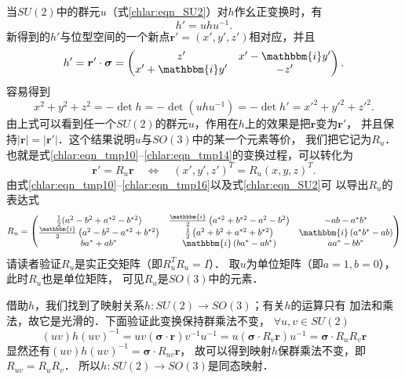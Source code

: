 当$SU(2)$中的群元$u$（式\eqref{chlar:eqn_SU2}）对$h$作幺正变换时，有
\begin{equation}\label{chlar:eqn_tmp10}
    h'= u h u^{-1} .
\end{equation}
新得到的$h'$与位型空间的一个新点$\boldsymbol{r}'=(x',y',z')$相对应，并且
\begin{equation}\label{chlar:eqn_tmp12}
    h'=\boldsymbol{r}'\cdot \boldsymbol{\sigma}
    =\begin{pmatrix}
        z' & x'- \mathbbm{i} y' \\ x'+ \mathbbm{i} y' & -z'
    \end{pmatrix} .
\end{equation}
容易得到
\begin{equation}\label{chlar:eqn_tmp14}
    x^2+y^2+z^2 = -\det h = -\det(u h u^{-1}) = -\det h' = x'^2+y'^2+z'^2 .
\end{equation}
由上式可以看到任一个$SU(2)$的群元$u$，作用在$h$上的效果是把$\boldsymbol{r}$变为$\boldsymbol{r}'$，
并且保持$|\boldsymbol{r}|=|\boldsymbol{r}'|$．这个结果说明$u$与$SO(3)$中的某一个元素等价，
我们把它记为$R_u$．也就是式\eqref{chlar:eqn_tmp10}--\eqref{chlar:eqn_tmp14}的变换过程，可以转化为
\begin{equation}\label{chlar:eqn_tmp16}
    \boldsymbol{r}'= R_u \boldsymbol{r} \quad \Leftrightarrow \quad
    (x', y', z')^T = R_u (x,y,z)^T .
\end{equation}
由式\eqref{chlar:eqn_tmp10}--\eqref{chlar:eqn_tmp16}以及式\eqref{chlar:eqn_SU2}可
以导出$R_u$的表达式
\begin{equation}\label{chlar:eqn_Ru}
    R_u=\begin{pmatrix}
    \frac{1}{2}(a^2-b^2+a^{*2}-b^{*2}) & 
    \frac{\mathbbm{i}}{2} \left(a^{*2}+b^{*2}-a^2-b^2\right) &     -a b-a^* b^* \\
    \frac{\mathbbm{i}}{2} \left(a^2-b^2-a^{*2}+b^{*2}\right) &
    \frac{1}{2} \left(a^2+b^2+a^{*2}+b^{*2}\right) & 
    \mathbbm{i} \left(a^* b^* -a b\right) \\
    b a^*+a b^* & \mathbbm{i} \left(b a^*-a b^*\right) &    a a^*-b b^* 
\end{pmatrix} 
\end{equation}  %
请读者验证$R_u$是实正交矩阵（即$R_u^T R_u=I$）．
取$u$为单位矩阵（即$a=1,b=0$），此时$R_u$也是单位矩阵，
可见$R_u$是$SO(3)$中的元素．

借助$h$，我们找到了映射关系$h:SU(2)\to SO(3)$；有关$h$的运算只有
加法和乘法，故它是光滑的．下面验证此变换保持群乘法不变，
$\forall u,v \in SU(2)$
\begin{equation}
    (uv) h (uv)^{-1}= u v (\boldsymbol{\sigma}\cdot \boldsymbol{r})v^{-1} u ^{-1}
    = u (\boldsymbol{\sigma}\cdot R_v \boldsymbol{r}) u ^{-1}
    = \boldsymbol{\sigma}\cdot R_u R_v \boldsymbol{r}
\end{equation}
显然还有$(uv) h (uv)^{-1} = \boldsymbol{\sigma}\cdot R_{uv}\boldsymbol{r}$，
故可以得到映射$h$保群乘法不变，即$R_{uv}=R_{u}R_{v}$．
所以$h:SU(2)\to SO(3)$是同态映射．

